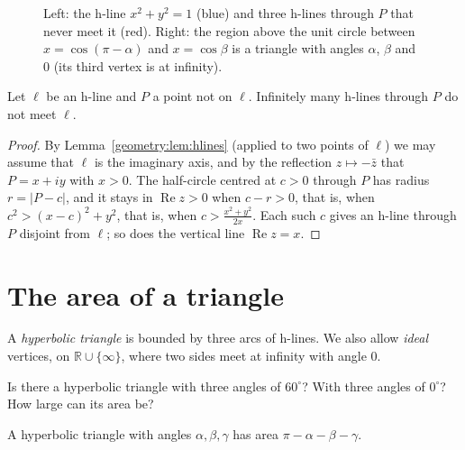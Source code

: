 \begin{figure}[ht]
\centering
{}
\caption{Left: the h-line $x^2+y^2=1$ (blue) and three h-lines through $P$ that never meet it (red). Right: the region above the unit circle between
$x=\cos(\pi-\alpha)$ and $x=\cos\beta$ is a triangle with angles $\alpha$, $\beta$ and $0$ (its third vertex is at infinity).}
\label{geometry:fig:halfplane}
\end{figure}

\begin{proposition}\label{geometry:prop:parallels}
Let $\ell$ be an h-line and $P$ a point not on $\ell$. Infinitely many h-lines through $P$ do not meet $\ell$.
\end{proposition}

\begin{proof}
By Lemma~\ref{geometry:lem:hlines} (applied to two points of $\ell$) we may assume that $\ell$ is the imaginary axis, and by the reflection $z\mapsto-\bar z$ that
$P=x+iy$ with $x>0$. The half-circle centred at $c>0$ through $P$ has radius $r=|P-c|$, and it stays in $\operatorname{Re}z>0$ when $c-r>0$, that is, when
$c^2>(x-c)^2+y^2$, that is, when $c>\frac{x^2+y^2}{2x}$. Each such $c$ gives an h-line through $P$ disjoint from $\ell$; so does the vertical line
$\operatorname{Re}z=x$.
\end{proof}

\section{The area of a triangle}

A \emph{hyperbolic triangle} is bounded by three arcs of h-lines. We also allow \emph{ideal} vertices, on $\mathbb R\cup\{\infty\}$, where two sides meet at
infinity with angle $0$.

\begin{think}
Is there a hyperbolic triangle with three angles of $60^\circ$? With three angles of $0^\circ$? How large can its area be?
\end{think}

\begin{theorem}\label{geometry:thm:hyparea}
A hyperbolic triangle with angles $\alpha,\beta,\gamma$ has area $\pi-\alpha-\beta-\gamma$.
\end{theorem}

